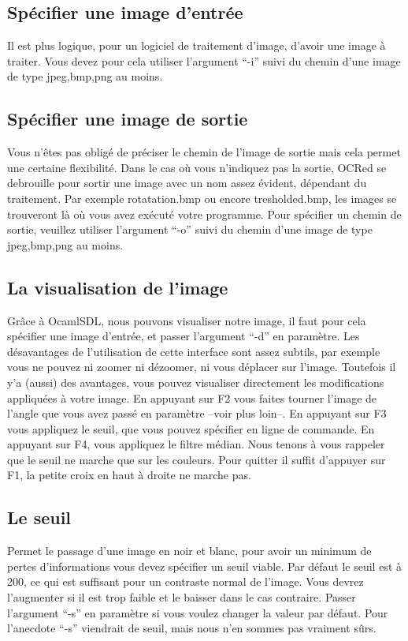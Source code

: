 \documentclass[a4paper,12pt]{report}
\begin{document}
\subsection{ Sp\'ecifier une image d'entr\'ee }
 Il est plus logique, pour un logiciel de traitement d'image, d'avoir
 une image \`a traiter. Vous devez pour cela utiliser l'argument ``-i''
 suivi du chemin d'une image de type jpeg,bmp,png au moins.
\subsection{ Sp\'ecifier une image de sortie }
 Vous n'\^etes pas oblig\'e de pr\'eciser le chemin de l'image de sortie
 mais cela permet une certaine flexibilit\'e. Dans le cas o\`u vous
 n'indiquez pas la sortie, OCRed se debrouille pour sortir une image
 avec un nom assez \'evident, d\'ependant du traitement. Par exemple
 rotatation.bmp ou encore tresholded.bmp, les images se trouveront l\`a
 o\`u vous avez ex\'ecut\'e votre programme. Pour sp\'ecifier un chemin de
 sortie, veuillez utiliser l'argument ``-o'' suivi du chemin d'une image
de type jpeg,bmp,png au moins.
\subsection{ La visualisation de l'image }
 Gr\^ace \`a OcamlSDL, nous pouvons visualiser notre image, il faut pour
 cela sp\'ecifier une image d'entr\'ee, et passer l'argument ``-d'' en
 param\`etre. Les d\'esavantages de l'utilisation de cette interface sont
 assez subtils, par exemple vous ne pouvez ni zoomer ni d\'ezoomer, ni
 vous d\'eplacer sur l'image. Toutefois il y'a (aussi) des avantages, vous pouvez
 visualiser directement les modifications appliqu\'ees \`a votre
 image. En appuyant sur F2 vous faites tourner l'image de l'angle que
 vous avez pass\'e en param\`etre --voir plus loin--. En appuyant sur F3
 vous appliquez le seuil, que vous pouvez sp\'ecifier en ligne de
 commande. En appuyant sur F4, vous appliquez le filtre m\'edian. Nous
 tenons \`a vous rappeler que le seuil ne marche que sur les couleurs.
 Pour quitter il suffit d'appuyer sur F1, la petite croix en haut \`a
 droite ne marche pas.
\subsection{ Le seuil }
 Permet le passage d'une image en noir et blanc, pour avoir un minimum
 de pertes d'informations vous devez sp\'ecifier un seuil viable. Par
 d\'efaut le seuil est \`a 200, ce qui est suffisant pour un contraste
 normal de l'image. Vous devrez l'augmenter si il est trop faible et le
 baisser dans le cas contraire. Passer l'argument ``-s'' en
 param\`etre si vous voulez changer la valeur par d\'efaut. Pour
 l'anecdote ``-s'' viendrait de seuil, mais nous n'en sommes pas vraiment
 s\^urs.
\end{document}
